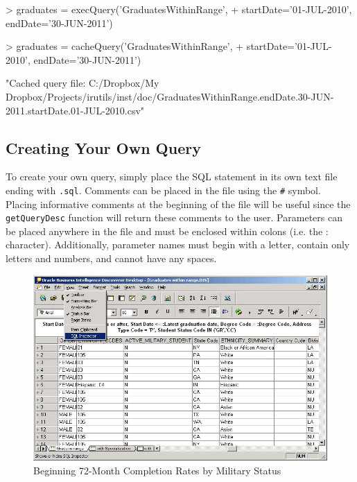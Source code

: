 \documentclass[letterpaper,11pt]{article}
\begin{document}
\begin{Schunk}
\begin{Sinput}
> graduates = execQuery('GraduatesWithinRange', 
+ 	startDate='01-JUL-2010', endDate='30-JUN-2011')
\end{Sinput}
\end{Schunk}

\begin{Schunk}
\begin{Sinput}
> graduates = cacheQuery('GraduatesWithinRange', 
+ 	startDate='01-JUL-2010', endDate='30-JUN-2011')
\end{Sinput}
\begin{Soutput}
[1] "Cached query file: C:/Dropbox/My Dropbox/Projects/irutils/inst/doc/GraduatesWithinRange.endDate.30-JUN-2011.startDate.01-JUL-2010.csv"
\end{Soutput}
\end{Schunk}

\subsection{Creating Your Own Query}

To create your own query, simply place the SQL statement in its own text file ending with \texttt{.sql}. Comments can be placed in the file using the \texttt{\#} symbol. Placing informative comments at the beginning of the file will be useful since the \texttt{getQueryDesc} function will return these comments to the user. Parameters can be placed anywhere in the file and must be enclosed within colons (i.e. the : character). Additionally, parameter names must begin with a letter, contain only letters and numbers, and cannot have any spaces.

\begin{figure}[h]
\begin{center}
\includegraphics{DiscovererMenu}
\caption{Beginning 72-Month Completion Rates by Military Status}
\label{fig:discoverer}
\end{center}
\end{figure}
\end{document}
